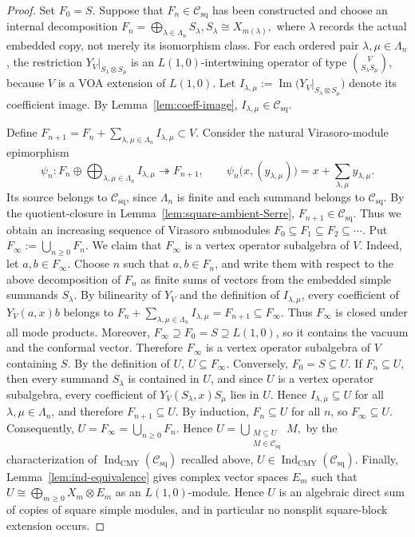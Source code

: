 \documentclass[12pt,leqno]{amsart}
\numberwithin{equation}{section} \newtheorem{thm}{Theorem}[section] \newtheorem{lem}[thm]{Lemma} \newtheorem{ex}[thm]{Example} \newtheorem{prop}[thm]{Proposition} \newtheorem{cor}[thm]{Corollary} \newtheorem{defi}[thm]{Definition} \newtheorem{rmk}[thm]{Remark} \newtheorem{notation}[thm]{Notation}
\newcommand{\Csq}{\mathcal C_{\mathrm{sq}}}
\newcommand{\IndCMY}{\operatorname{Ind}_{\mathrm{CMY}}}
\begin{document}
\begin{proof}
Set \(F_0=S\). Suppose that \(F_n\in\Csq\) has been constructed and choose an internal decomposition \(F_n=\bigoplus_{\lambda\in\Lambda_n}S_\lambda,S_\lambda\cong X_{m(\lambda)},\) where $\lambda$ records the actual embedded copy, not merely its isomorphism class. For each ordered pair \(\lambda,\mu\in\Lambda_n\), the restriction \(Y_V|_{S_\lambda\otimes S_\mu}\) is an $L(1,0)$-intertwining operator of type \(\binom{V}{S_\lambda S_\mu},\) because $V$ is a VOA extension of $L(1,0)$. Let \(I_{\lambda,\mu}:=\operatorname{Im}\bigl(Y_V|_{S_\lambda\otimes S_\mu}\bigr)\) denote its coefficient image. By Lemma~\ref{lem:coeff-image}, \(I_{\lambda,\mu}\in\Csq\).

Define \(F_{n+1}=F_n+\sum_{\lambda,\mu\in\Lambda_n}I_{\lambda,\mu}\subset V.\) Consider the natural Virasoro-module epimorphism
\[
\psi_n:
F_n\oplus
\bigoplus_{\lambda,\mu\in\Lambda_n}I_{\lambda,\mu}
\twoheadrightarrow F_{n+1},
\qquad
\psi_n\bigl(x,(y_{\lambda,\mu})\bigr)
=
x+\sum_{\lambda,\mu}y_{\lambda,\mu}.
\]
Its source belongs to $\Csq$, since $\Lambda_n$ is finite and each summand belongs to $\Csq$. By the quotient-closure in Lemma~\ref{lem:square-ambient-Serre}, \(F_{n+1}\in\Csq\). Thus we obtain an increasing sequence of Virasoro submodules \(F_0\subseteq F_1\subseteq F_2\subseteq\cdots.\) Put \(F_\infty:=\bigcup_{n\ge0}F_n.\) We claim that $F_\infty$ is a vertex operator subalgebra of $V$. Indeed, let \(a,b\in F_\infty\). Choose \(n\) such that \(a,b\in F_n\), and write them with respect to the above decomposition of \(F_n\) as finite sums of vectors from the embedded simple summands \(S_\lambda\). By bilinearity of $Y_V$ and the definition of \(I_{\lambda,\mu}\), every coefficient of \(Y_V(a,x)b\) belongs to \(F_n+\sum_{\lambda,\mu\in\Lambda_n}I_{\lambda,\mu}=F_{n+1}\subseteq F_\infty.\) Thus $F_\infty$ is closed under all mode products. Moreover, \(F_\infty\supseteq F_0=S\supseteq L(1,0)\), so it contains the vacuum and the conformal vector. Therefore $F_\infty$ is a vertex operator subalgebra of $V$ containing $S$. By the definition of $U$, \(U\subseteq F_\infty.\) Conversely, \(F_0=S\subseteq U\). If \(F_n\subseteq U\), then every summand \(S_\lambda\) is contained in $U$, and since $U$ is a vertex operator subalgebra, every coefficient of \(Y_V(S_\lambda,x)S_\mu\) lies in $U$. Hence \(I_{\lambda,\mu}\subseteq U\) for all \(\lambda,\mu\in\Lambda_n\), and therefore \(F_{n+1}\subseteq U\). By induction, \(F_n\subseteq U\) for all \(n\), so \(F_\infty\subseteq U.\) Consequently, \(U=F_\infty=\bigcup_{n\ge0}F_n.\) Hence \(U=\bigcup_{\substack{M\subseteq U\\M\in\Csq}}M,\) by the characterization of \(\IndCMY(\Csq)\) recalled above, \(U\in\IndCMY(\Csq)\). Finally, Lemma~\ref{lem:ind-equivalence} gives complex vector spaces \(E_m\) such that \(U\cong\bigoplus_{m\ge0}X_m\otimes E_m\) as an $L(1,0)$-module. Hence $U$ is an algebraic direct sum of copies of square simple modules, and in particular no nonsplit square-block extension occurs.
\end{proof}
\end{document}
